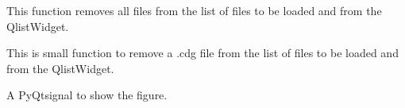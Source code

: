 \documentclass[letterpaper,10pt,english]{sphinxmanual}
\begin{document}
\begin{fulllineitems}

\begin{fulllineitems}
\label{\detokenize{index:src_GUI.hydro_GUI_2.River2D.remove_all_file}}
This function removes all files from the list of files to be loaded and from the QlistWidget.

\end{fulllineitems}


\begin{fulllineitems}
\label{\detokenize{index:src_GUI.hydro_GUI_2.River2D.remove_file}}
This is small function to remove a .cdg file from the list of files to be loaded and from the QlistWidget.

\end{fulllineitems}


\begin{fulllineitems}
\label{\detokenize{index:src_GUI.hydro_GUI_2.River2D.show_fig}}
A PyQtsignal to show the figure.

\end{fulllineitems}


\end{fulllineitems}

\end{document}
